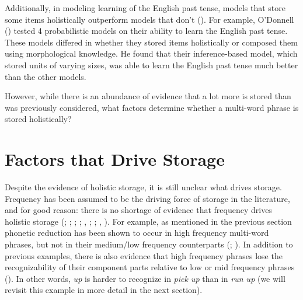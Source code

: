 \documentclass[
  12pt,
  letterpaper,
]{scrreprt}
\begin{document}
Additionally, in modeling learning of the English past tense, models
that store some items holistically outperform models that don't
().
For example, O'Donnell
() tested 4
probabilistic models on their ability to learn the English past tense.
These models differed in whether they stored items holistically or
composed them using morphological knowledge. He found that their
inference-based model, which stored units of varying sizes, was able to
learn the English past tense much better than the other models.

However, while there is an abundance of evidence that a lot more is
stored than was previously considered, what factors determine whether a
multi-word phrase is stored holistically?

\section{Factors that Drive
Storage}\label{sec-factors-that-drive-storage}

Despite the evidence of holistic storage, it is still unclear what
drives storage. Frequency has been assumed to be the driving force of
storage in the literature, and for good reason: there is no shortage of
evidence that frequency drives holistic storage
(; ; ;
; ,
;
; ,
). For example, as
mentioned in the previous section phonetic reduction has been shown to
occur in high frequency multi-word phrases, but not in their medium/low
frequency counterparts (;
).
In addition to previous examples, there is also evidence that high
frequency phrases lose the recognizability of their component parts
relative to low or mid frequency phrases
(). In other words, \emph{up} is harder to recognize in
\emph{pick up} than in \emph{run up} (we will revisit this example in
more detail in the next section).
\end{document}
